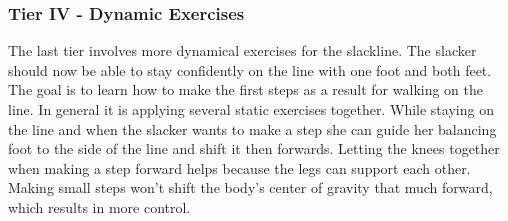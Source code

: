 \subsubsection{Tier IV - Dynamic Exercises}
The last tier involves more dynamical exercises for the slackline. The slacker should now be able to stay confidently on the line with one foot and both feet. The goal is to learn how to make the first steps as a result for walking on the line. In general it is applying several static exercises together. While staying on the line and when the slacker wants to make a step she can guide her balancing foot to the side of the line and shift it then forwards. Letting the knees together when making a step forward helps because the legs can support each other. Making small steps won't shift the body's center of gravity that much forward, which results in more control.
